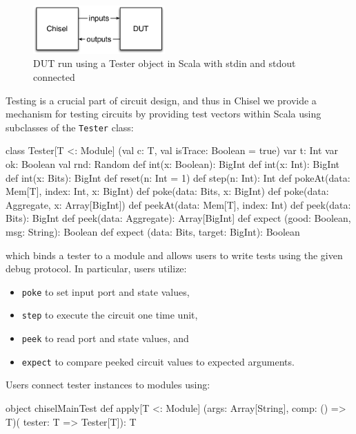 \documentclass[10pt,twocolumn]{article}
\def\code#1{{\small\tt #1}}
\begin{document}
\begin{figure}
\begin{center}
\includegraphics[width=0.45\textwidth]{../tutorial/figs/DUT.pdf}
\end{center}
\caption{DUT run using a Tester object in Scala with stdin and stdout connected}
\label{fig:dut}
\end{figure}
 
Testing is a crucial part of circuit design, 
and thus in Chisel we provide a mechanism for
testing circuits by providing test vectors within Scala using
subclasses of the \code{Tester} class:

\begin{scala}
class Tester[T <: Module] 
    (val c: T, val isTrace: Boolean = true) {
  var t: Int
  var ok: Boolean
  val rnd: Random
  def int(x: Boolean): BigInt
  def int(x: Int): BigInt
  def int(x: Bits): BigInt
  def reset(n: Int = 1)
  def step(n: Int): Int
  def pokeAt(data: Mem[T], index: Int, x: BigInt)
  def poke(data: Bits, x: BigInt)
  def poke(data: Aggregate, x: Array[BigInt])
  def peekAt(data: Mem[T], index: Int)
  def peek(data: Bits): BigInt
  def peek(data: Aggregate): Array[BigInt]
  def expect (good: Boolean, msg: String): Boolean
  def expect (data: Bits, target: BigInt): Boolean
}
\end{scala}

\noindent
which binds a tester to a module
and allows users to write tests using the given debug protocol.  In particular, users utilize:
\begin{itemize}
\item \code{poke} to set input port and state values,
\item \code{step} to execute the circuit one time unit,
\item \code{peek} to read port and state values, and
\item \code{expect} to compare peeked circuit values to expected arguments.
\end{itemize}

\noindent
Users connect tester instances to modules using:

\begin{scala}
object chiselMainTest {
  def apply[T <: Module]
    (args: Array[String], comp: () => T)(
     tester: T => Tester[T]): T
}
\end{scala}
\end{document}
